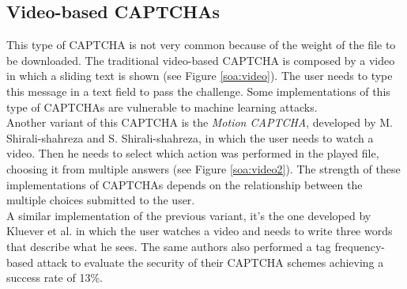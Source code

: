 \subsection{Video-based CAPTCHAs}
This type of CAPTCHA is not very common because of the weight of the file to be downloaded\cite{survey_advanced_CAPTCHA}. The traditional video-based CAPTCHA is composed by a video in which a sliding text is shown (see Figure \ref{soa:video}). The user needs to type this message in a text field to pass the challenge. Some implementations of this type of CAPTCHAs are vulnerable to machine learning attacks.\\
Another variant of this CAPTCHA is the \textit{Motion CAPTCHA}\cite{Motion_CAPTCHA}, developed by M. Shirali-shahreza and S. Shirali-shahreza, in which the user needs to watch a video. Then he needs to select which action was performed in the played file, choosing it from multiple answers (see Figure \ref{soa:video2}). The strength of these implementations of CAPTCHAs depends on the relationship between the multiple choices submitted to the user\cite{video_attack}.\\
A similar implementation of the previous variant, it's the one developed by Kluever et al. in which the user watches a video and needs to write three words that describe what he sees\cite{video_desc}. The same authors also performed a tag frequency-based attack to evaluate the security of their CAPTCHA schemes achieving a success rate of 13\%.
